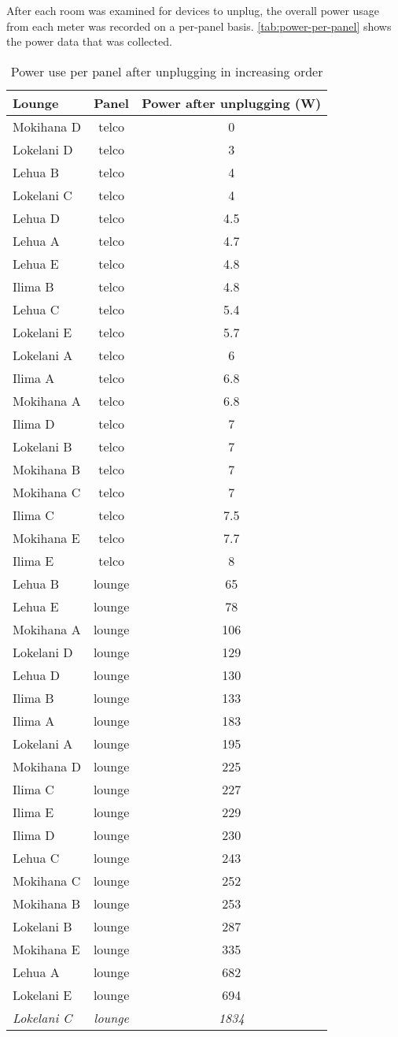 \documentclass[11pt,final]{article}
\begin{document}
After each room was examined for devices to unplug, the overall power usage from each meter was recorded on a per-panel basis. \autoref{tab:power-per-panel} shows the power data that was collected.

\begin{table}[htbp]
	\centering
	\scriptsize
		\begin{tabular}{| l | c | c |}
			\hline
			Lounge & Panel & Power after unplugging (W) \tabularnewline \hline \hline
			Mokihana D & telco & 0 \tabularnewline \hline
			Lokelani D & telco & 3 \tabularnewline \hline
			Lehua B & telco & 4 \tabularnewline \hline
			Lokelani C & telco & 4 \tabularnewline \hline
			Lehua D & telco & 4.5 \tabularnewline \hline
			Lehua A & telco & 4.7 \tabularnewline \hline
			Lehua E & telco & 4.8 \tabularnewline \hline
			Ilima B & telco & 4.8 \tabularnewline \hline
			Lehua C & telco & 5.4 \tabularnewline \hline
			Lokelani E & telco & 5.7 \tabularnewline \hline
			Lokelani A & telco & 6 \tabularnewline \hline
			Ilima A & telco & 6.8 \tabularnewline \hline
			Mokihana A & telco & 6.8 \tabularnewline \hline
			Ilima D & telco & 7 \tabularnewline \hline
			Lokelani B & telco & 7 \tabularnewline \hline
			Mokihana B & telco & 7 \tabularnewline \hline
			Mokihana C & telco & 7 \tabularnewline \hline
			Ilima C & telco & 7.5 \tabularnewline \hline
			Mokihana E & telco &7.7 \tabularnewline \hline
			Ilima E & telco & 8 \tabularnewline \hline \hline
			Lehua B & lounge & 65 \tabularnewline \hline
			Lehua E & lounge & 78 \tabularnewline \hline
			Mokihana A & lounge & 106 \tabularnewline \hline
			Lokelani D & lounge & 129 \tabularnewline \hline
			Lehua D & lounge & 130 \tabularnewline \hline
			Ilima B & lounge & 133 \tabularnewline \hline \hline
			Ilima A & lounge & 183 \tabularnewline \hline
			Lokelani A & lounge & 195 \tabularnewline \hline
			Mokihana D & lounge & 225 \tabularnewline \hline
			Ilima C & lounge & 227 \tabularnewline \hline
			Ilima E & lounge & 229 \tabularnewline \hline
			Ilima D & lounge & 230 \tabularnewline \hline
			Lehua C & lounge & 243 \tabularnewline \hline
			Mokihana C & lounge & 252 \tabularnewline \hline
			Mokihana B & lounge & 253 \tabularnewline \hline
			Lokelani B & lounge & 287 \tabularnewline \hline
			Mokihana E & lounge & 335 \tabularnewline \hline
			Lehua A & lounge & 682 \tabularnewline \hline
			Lokelani E & lounge & 694 \tabularnewline \hline \hline
			\emph{Lokelani C} & \emph{lounge} & \emph{1834} \tabularnewline \hline
		\end{tabular}
	\caption{Power use per panel after unplugging in increasing order}
\label{tab:power-per-panel}
\end{table}
\end{document}
